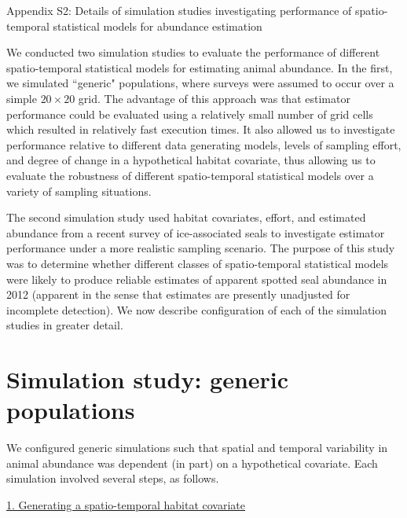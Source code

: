 \documentclass[12pt,fleqn]{article}
\begin{document}
\rm \begin{flushleft}

\raggedbottom
\vspace{.5in}


\begin{center}
Appendix S2: Details of simulation studies investigating performance of spatio-temporal statistical models for abundance estimation
\bigskip
\end{center}

\doublespacing
We conducted two simulation studies to evaluate the performance of different spatio-temporal statistical models for estimating animal abundance.  In the first, we simulated ``generic" populations, where surveys were assumed to occur over a simple $20 \times 20$ grid.  The advantage of this approach was that estimator performance could be evaluated using a relatively small number of grid cells which resulted in relatively fast execution times.  It also allowed us to investigate performance relative to different data generating models, levels of sampling effort, and degree of change in a hypothetical habitat covariate, thus allowing us to evaluate the robustness of different spatio-temporal statistical models over a variety of sampling situations.

\hspace{.5in} The second simulation study used habitat covariates, effort, and estimated abundance from a recent survey of ice-associated seals \citep[see e.g.,][]{ConnEtAl2014} to investigate estimator performance under a more realistic sampling scenario.  The purpose of this study was to determine whether different classes of spatio-temporal statistical models were likely to produce reliable estimates of apparent spotted seal abundance in 2012 (apparent in the sense that estimates are presently unadjusted for incomplete detection).  We now describe configuration of each of the simulation studies in greater detail.

\section{Simulation study: generic populations}

We configured generic simulations such that spatial and temporal variability in animal abundance was dependent (in part) on a hypothetical covariate.  Each simulation involved several steps, as follows.

\underline{1. Generating a spatio-temporal habitat covariate}


\end{flushleft}
\end{document}
